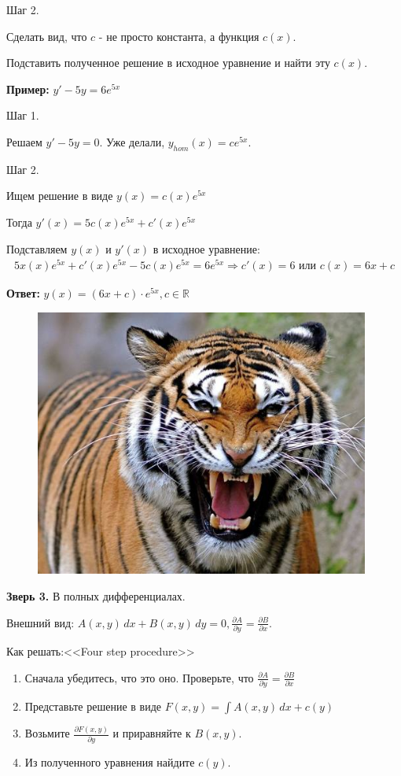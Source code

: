 \documentclass[10pt, a4paper]{article}
\begin{document}
\par Шаг 2.
\par Сделать вид, что $c$ - не просто константа, а функция $c(x)$.
\par Подставить полученное решение в исходное уравнение и найти эту $c(x)$.
\par \textbf{Пример:} $y' - 5y = 6e^{5x}$
\par Шаг 1.
\par Решаем $y' - 5y = 0$. Уже делали, $y_{hom}(x) = ce^{5x}$.
\par Шаг 2.
\par Ищем решение в виде $y(x) = c(x) e^{5x}$
\par Тогда $y'(x) = 5c(x) e^{5x} + c'(x)e^{5x}$
\par Подставляем $y(x)$ и $y'(x)$ в исходное уравнение:
\begin{eqnarray*}
5x(x) e^{5x} + c'(x) e^{5x} - 5c(x)e^{5x} = 6e^{5x} \Rightarrow c'(x) = 6 \text{ или } c(x) = 6x + c
\end{eqnarray*}
\par \textbf{Ответ:} $y(x) = (6x + c) \cdot e^{5x}, c \in \mathbb{R}$ \\
\newpage{}
\pagecolor{magenta}
\begin{figure}[h]
\centering
\includegraphics[width=11cm]{tiger.jpg}
\end{figure}
\par \textbf{Зверь 3.} В полных дифференциалах.
\par Внешний вид: $A(x, y) \, dx + B(x,y) \, dy = 0, \frac{\partial{A}}{\partial{y}} = \frac{\partial{B}}{\partial{x}}$.
\par Как решать:<<Four step procedure>>
\begin{enumerate}
\item Сначала убедитесь, что это оно. Проверьте, что $\frac{\partial{A}}{\partial{y}} = \frac{\partial{B}}{\partial{x}}$
\item Представьте решение в виде $F(x,y) = \int A(x,y) \, dx + c(y)$
\item Возьмите $\frac{\partial{F(x,y)}}{\partial{y}}$ и приравняйте к $B(x,y)$.
\item Из полученного уравнения найдите $c(y)$.
\end{enumerate}
\end{document}
